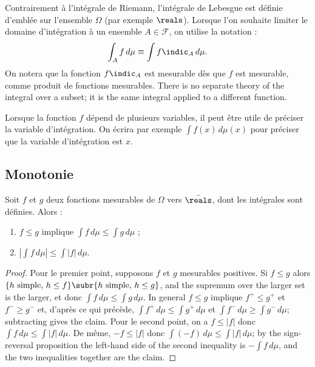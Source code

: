 \begin{remark}
  Contrairement à l'intégrale de Riemann, l'intégrale de Lebesgue est définie
  d'emblée sur l'ensemble $\Omega$ (par exemple $\reals$). Lorsque l'on souhaite
  limiter le domaine d'intégration à un ensemble $A \in \mathcal{F}$, on utilise la
  notation :
  \[
    \int_{A} f \, d\mu \equiv \int f \indic_{A} \, d\mu .
  \]
  On notera que la fonction $f \indic_{A}$ est mesurable dès que $f$ est mesurable,
  comme produit de fonctions mesurables. There is no separate theory of the integral
  over a subset; it is the same integral applied to a different function.
\end{remark}

\begin{notation}
  Lorsque la fonction $f$ dépend de plusieurs variables, il peut être utile de
  préciser la variable d'intégration. On écrira par exemple $\int f(x) \, d\mu(x)$
  pour préciser que la variable d'intégration est $x$.
\end{notation}

\subsection{Monotonie}

\begin{lemma}[Monotonie]
  Soit $f$ et $g$ deux fonctions mesurables de $\Omega$ vers $\bar{\reals}$, dont les
  intégrales sont définies. Alors :
  \begin{enumerate}
    \item $f \leq g$ implique $\int f \, d\mu \leq \int g \, d\mu$ ;
    \item $\left| \int f \, d\mu \right| \leq \int |f| \, d\mu$.
  \end{enumerate}
\end{lemma}

\begin{proof}
  Pour le premier point, supposons $f$ et $g$ mesurables positives. Si $f \leq g$
  alors $\{h \text{ simple}, \, h \leq f\} \subr \{h \text{ simple}, \, h \leq g\}$,
  and the supremum over the larger set is the larger, et donc $\int f \, d\mu \leq
  \int g \, d\mu$. In general $f \leq g$ implique $f^{+} \leq g^{+}$ et $f^{-} \geq
  g^{-}$ et, d'après ce qui précède, $\int f^{+} \, d\mu \leq \int g^{+} \, d\mu$ et
  $\int f^{-} \, d\mu \geq \int g^{-} \, d\mu$; subtracting gives the claim. Pour le
  second point, on a $f \leq |f|$ donc $\int f \, d\mu \leq \int |f| \, d\mu$. De
  même, $-f \leq |f|$ donc $\int (-f) \, d\mu \leq \int |f| \, d\mu$; by the
  sign-reversal proposition the left-hand side of the second inequality is $-\int f
  \, d\mu$, and the two inequalities together are the claim.
\end{proof}

